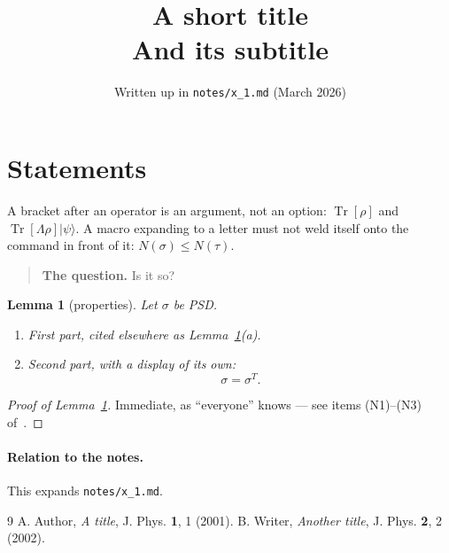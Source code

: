 \documentclass{article}
\title{A short title\\[1ex] {\large And its subtitle}}
\date{Written up in \texttt{notes/x\_1.md} (March 2026)}
\newtheorem{lemma}{Lemma}[section]
\newcommand{\Neg}{N}
\newcommand{\ket}[1]{|#1\rangle}
\DeclareMathOperator{\Tr}{Tr}
\begin{document}
\maketitle

\section{Statements}\label{sec:stmt}

A bracket after an operator is an argument, not an option: $\Tr[\rho]$ and
$\Tr[\Lambda\rho]\ket\psi$. A macro expanding to a letter must not weld
itself onto the command in front of it: $\Neg(\sigma)\le\Neg(\tau)$.

\begin{quote}
\textbf{The question.} Is it so?
\end{quote}

\begin{lemma}[properties]\label{lem:props}
Let $\sigma$ be PSD.
\begin{enumerate}[label=(\alph*),nosep]
\item First part, cited elsewhere as Lemma~\ref{lem:props}(a).
\item Second part, with a display of its own:
\[
  \sigma = \sigma^{T}.
\]
\end{enumerate}
\end{lemma}

\begin{proof}[Proof of Lemma~\ref{lem:props}]
Immediate, as ``everyone'' knows --- see items (N1)--(N3) of~\cite{two}.
\end{proof}

\paragraph{Relation to the notes.} This expands \texttt{notes/x\_1.md}.

\begin{thebibliography}{9}
 A. Author, \emph{A title}, J. Phys. \textbf{1}, 1 (2001).
 B. Writer, \emph{Another title}, J. Phys. \textbf{2}, 2 (2002).
\end{thebibliography}
\end{document}
